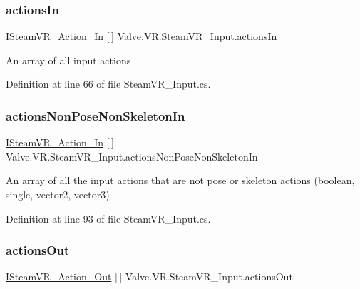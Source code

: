\subsubsection{\texorpdfstring{actionsIn}{actionsIn}}
{\footnotesize\ttfamily \mbox{\hyperlink{interface_valve_1_1_v_r_1_1_i_steam_v_r___action___in}{I\+Steam\+V\+R\+\_\+\+Action\+\_\+\+In}} \mbox{[}$\,$\mbox{]} Valve.\+V\+R.\+Steam\+V\+R\+\_\+\+Input.\+actions\+In\hspace{0.3cm}{\ttfamily [static]}}



An array of all input actions 



Definition at line 66 of file Steam\+V\+R\+\_\+\+Input.\+cs.

\mbox{\label{class_valve_1_1_v_r_1_1_steam_v_r___input_ad0f4a157c015d646f1239070f12cd565}} 
\subsubsection{\texorpdfstring{actionsNonPoseNonSkeletonIn}{actionsNonPoseNonSkeletonIn}}
{\footnotesize\ttfamily \mbox{\hyperlink{interface_valve_1_1_v_r_1_1_i_steam_v_r___action___in}{I\+Steam\+V\+R\+\_\+\+Action\+\_\+\+In}} \mbox{[}$\,$\mbox{]} Valve.\+V\+R.\+Steam\+V\+R\+\_\+\+Input.\+actions\+Non\+Pose\+Non\+Skeleton\+In\hspace{0.3cm}{\ttfamily [static]}}



An array of all the input actions that are not pose or skeleton actions (boolean, single, vector2, vector3) 



Definition at line 93 of file Steam\+V\+R\+\_\+\+Input.\+cs.

\mbox{\label{class_valve_1_1_v_r_1_1_steam_v_r___input_aefbdcd03e7607dc2d129578b59be3d12}} 
\subsubsection{\texorpdfstring{actionsOut}{actionsOut}}
{\footnotesize\ttfamily \mbox{\hyperlink{interface_valve_1_1_v_r_1_1_i_steam_v_r___action___out}{I\+Steam\+V\+R\+\_\+\+Action\+\_\+\+Out}} \mbox{[}$\,$\mbox{]} Valve.\+V\+R.\+Steam\+V\+R\+\_\+\+Input.\+actions\+Out\hspace{0.3cm}{\ttfamily [static]}}




